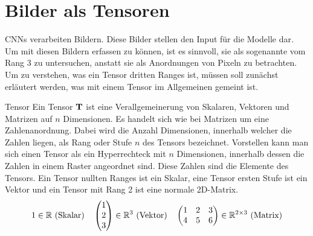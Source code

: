 \section{Bilder als Tensoren}\label{sec:tensor}
CNNs verarbeiten Bildern. Diese Bilder stellen den Input für die Modelle dar.
Um mit diesen Bildern erfassen zu können, ist es sinnvoll, sie als sogenannte
 vom Rang 3 zu untersuchen, anstatt sie als Anordnungen von
Pixeln zu betrachten. Um zu verstehen, was ein Tensor dritten Ranges ist, müssen
soll zunächst erläutert werden, was mit einem Tensor im Allgemeinen gemeint ist.

\begin{defbox}{Tensor}
  Ein Tensor $\mathbf{T}$ ist eine Verallgemeinerung von Skalaren, Vektoren und Matrizen auf
  $n$ Dimensionen. Es handelt sich wie bei Matrizen um
  eine Zahlenanordnung. Dabei wird die Anzahl Dimensionen, innerhalb welcher die
  Zahlen liegen, als Rang oder Stufe $n$ des Tensors bezeichnet. Vorstellen kann man sich einen Tensor
  als ein Hyperrechteck mit $n$ Dimensionen, innerhalb dessen die Zahlen in
  einem Raster angeordnet sind. Diese Zahlen sind die Elemente des Tensors.
  Ein Tensor nullten Ranges ist ein Skalar, eine Tensor ersten Stufe ist ein
  Vektor und ein Tensor mit Rang 2 ist eine normale 2D-Matrix.
  \begin{gather*}
    1 \in \mathbb{R} \text{ (Skalar)} \quad \begin{pmatrix} 1 \\ 2 \\ 3 \end{pmatrix}
    \in \mathbb{R}^3 \text{ (Vektor)} \quad
    \begin{pmatrix}
      1 & 2 & 3 \\
      4 & 5 & 6 \\
    \end{pmatrix} \in \mathbb{R}^{2 \times 3} \text{ (Matrix)}
  \end{gather*}
\end{defbox}

